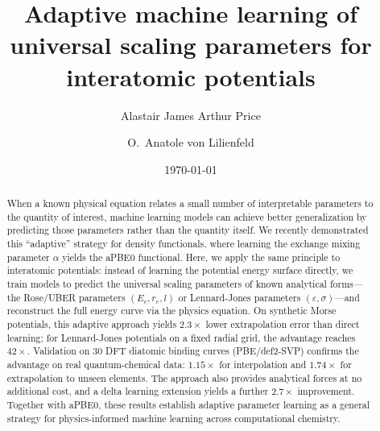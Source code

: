 \documentclass[aps,prb,twocolumn,superscriptaddress,longbibliography,floatfix]{revtex4-2}
\begin{document}
\title{Adaptive machine learning of universal scaling parameters for interatomic potentials}

\author{Alastair James Arthur Price}

\author{O.~Anatole von Lilienfeld}

\date{\today}

\begin{abstract}
When a known physical equation relates a small number of interpretable parameters to the quantity of interest, machine learning models can achieve better generalization by predicting those parameters rather than the quantity itself. We recently demonstrated this ``adaptive'' strategy for density functionals, where learning the exchange mixing parameter $\alpha$ yields the aPBE0 functional. Here, we apply the same principle to interatomic potentials: instead of learning the potential energy surface directly, we train models to predict the universal scaling parameters of known analytical forms---the Rose/UBER parameters $(E_c, r_e, l)$ or Lennard-Jones parameters $(\varepsilon, \sigma)$---and reconstruct the full energy curve via the physics equation. On synthetic Morse potentials, this adaptive approach yields $2.3\times$ lower extrapolation error than direct learning; for Lennard-Jones potentials on a fixed radial grid, the advantage reaches $42\times$. Validation on 30 DFT diatomic binding curves (PBE/def2-SVP) confirms the advantage on real quantum-chemical data: $1.15\times$ for interpolation and $1.74\times$ for extrapolation to unseen elements. The approach also provides analytical forces at no additional cost, and a delta learning extension yields a further $2.7\times$ improvement. Together with aPBE0, these results establish adaptive parameter learning as a general strategy for physics-informed machine learning across computational chemistry.
\end{abstract}

\maketitle
\end{document}
